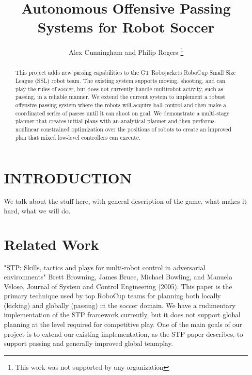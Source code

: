 \documentclass[a4paper, 10pt, conference]{ieeeconf}      %
\title{\LARGE \bf
Autonomous Offensive Passing Systems for Robot Soccer
}
\author{Alex Cunningham and Philip Rogers%
\thanks{This work was not supported by any organization}%
}
\begin{document}
\maketitle
\thispagestyle{empty}
\pagestyle{empty}


\begin{abstract}

This project adds new passing capabilities to the GT Robojackets RoboCup Small Size League (SSL) robot team. The existing system supports moving, shooting, and can play the rules of soccer, but does not currently handle multirobot activity, such as passing, in a reliable manner. We extend the current system to implement a robust offensive passing system where the robots will acquire ball control and then make a coordinated series of passes until it can shoot on goal. We demonstrate a multi-stage planner that creates initial plans with an analytical planner and then performs nonlinear constrained optimization over the positions of robots to create an improved plan that mixed low-level controllers can execute.  

\end{abstract}


\section{INTRODUCTION}

We talk about the stuff here, with general description of the game, what makes it hard, what we will do.

\section{Related Work}
"STP: Skills, tactics and plays for multi-robot control in adversarial environments" Brett Browning, James Bruce, Michael Bowling, and Manuela Veloso, Journal of System and Control Engineering (2005). This paper is the primary technique used by top RoboCup teams for planning both locally (kicking) and globally (passing) in the soccer domain. We have a rudimentary implementation of the STP framework currently, but it does not support global planning at the level required for competitive play. One of the main goals of our project is to extend our existing implementation, as the STP paper describes, to support passing and generally improved global teamplay.
\end{document}
